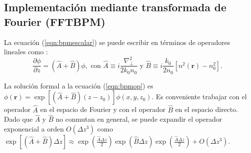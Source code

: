 \subsection{Implementación mediante transformada de Fourier (FFTBPM)}
La ecuación (\ref{eqn:bpmescalar}) se puede escribir en términos de operadores lineales como \citep{bpm}: 
\begin{equation}
	\frac{\partial \phi}{\partial z}  = \left(\hat{A} + \hat{B}\right)\phi, \text{ con } \hat{A} \equiv i\frac{\nabla^2_\perp}{2k_0n_0}\text{ y } \hat{B} \equiv i\frac{k_0}{2n_0}\left[n^2(\textbf{r})-n_0^2\right]. \label{eqn:bpmop}
\end{equation}

La solución formal a la ecuación (\ref{eqn:bpmop}) es $\phi(\textbf{r}) = \exp\left[\left(\hat{A} + \hat{B}\right)(z-z_0)\right]\phi(x, y, z_0)$. Es conveniente trabajar con el operador $\hat{A}$ en el espacio de Fourier y con el operador $\hat{B}$ en el espacio directo. Dado que $\hat{A}$ y $\hat{B}$ no conmutan en general, se puede expandir el operador exponencial a orden $O(\Delta z ^3)$ como $\exp\left[\left(\hat{A} + \hat{B}\right)\Delta z \right] \approx \exp\left(\frac{\hat{A}\Delta z}{2} \right)\exp\left(\hat{B}\Delta z \right)\exp\left(\frac{\hat{A}\Delta z}{2} \right) + O(\Delta z ^3)$.

